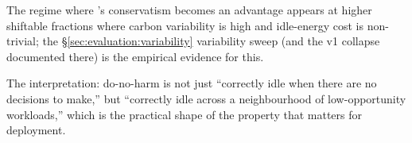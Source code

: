 The regime where \GreenFaaS{}'s conservatism becomes an advantage
appears at higher shiftable fractions where carbon variability is
high and idle-energy cost is non-trivial; the
\S\ref{sec:evaluation:variability} variability sweep (and the v1
collapse documented there) is the empirical evidence for this.

The interpretation: do-no-harm is not just ``correctly idle
when there are no decisions to make,'' but ``correctly idle across a
neighbourhood of low-opportunity workloads,'' which is the practical
shape of the property that matters for deployment.
